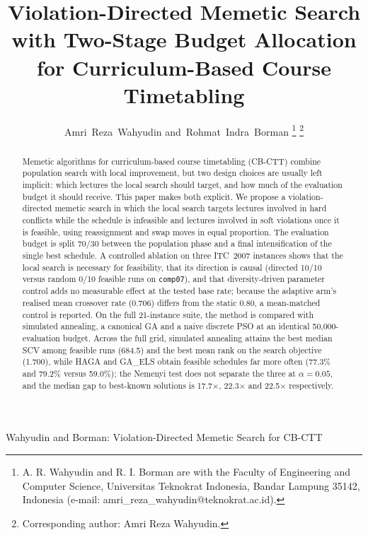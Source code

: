 \documentclass[journal]{IEEEtran}
\newcommand{\code}[1]{\texttt{#1}}
\begin{document}
\title{Violation-Directed Memetic Search with Two-Stage Budget Allocation for Curriculum-Based Course Timetabling}

\author{Amri~Reza~Wahyudin
        and~Rohmat~Indra~Borman%
\thanks{A. R. Wahyudin and R. I. Borman are with the Faculty of Engineering and Computer Science, Universitas Teknokrat Indonesia, Bandar Lampung 35142, Indonesia (e-mail: amri\_reza\_wahyudin@teknokrat.ac.id).}%
\thanks{Corresponding author: Amri Reza Wahyudin.}%
}

%
{Wahyudin and Borman: Violation-Directed Memetic Search for CB-CTT}

\maketitle

\begin{abstract}
Memetic algorithms for curriculum-based course timetabling (CB-CTT) combine population search with local improvement, but two design choices are usually left implicit: which lectures the local search should target, and how much of the evaluation budget it should receive. This paper makes both explicit. We propose a violation-directed memetic search in which the local search targets lectures involved in hard conflicts while the schedule is infeasible and lectures involved in soft violations once it is feasible, using reassignment and swap moves in equal proportion. The evaluation budget is split 70/30 between the population phase and a final intensification of the single best schedule. A controlled ablation on three ITC~2007 instances shows that the local search is necessary for feasibility, that its direction is causal (directed 10/10 versus random 0/10 feasible runs on \code{comp07}), and that diversity-driven parameter control adds no measurable effect at the tested base rate; because the adaptive arm's realised mean crossover rate (0.706) differs from the static 0.80, a mean-matched control is reported. On the full 21-instance suite, the method is compared with simulated annealing, a canonical GA and a naive discrete PSO at an identical 50{,}000-evaluation budget. Across the full grid, simulated annealing attains the best median SCV among feasible runs (684.5) and the best mean rank on the search objective (1.700), while HAGA and GA\_ELS obtain feasible schedules far more often (77.3\% and 79.2\% versus 59.0\%); the Nemenyi test does not separate the three at $\alpha=0.05$, and the median gap to best-known solutions is 17.7$\times$, 22.3$\times$ and 22.5$\times$ respectively.
\end{abstract}
\end{document}
